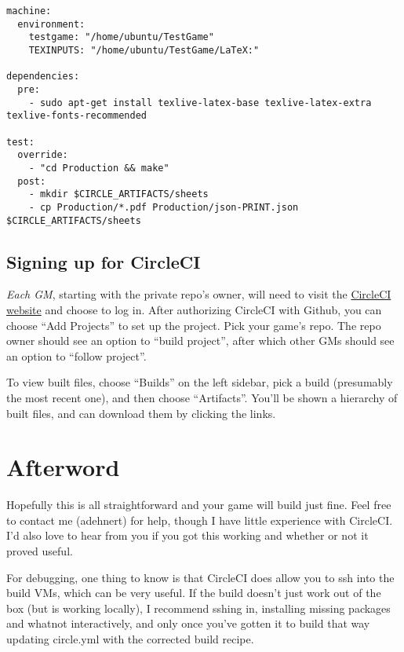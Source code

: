 \documentclass[green]{testgame}
\begin{document}
\begin{verbatim}
machine:
  environment:
    testgame: "/home/ubuntu/TestGame"
    TEXINPUTS: "/home/ubuntu/TestGame/LaTeX:"

dependencies:
  pre:
    - sudo apt-get install texlive-latex-base texlive-latex-extra texlive-fonts-recommended

test:
  override:
    - "cd Production && make"
  post:
    - mkdir $CIRCLE_ARTIFACTS/sheets
    - cp Production/*.pdf Production/json-PRINT.json $CIRCLE_ARTIFACTS/sheets
\end{verbatim}

\subsection{Signing up for CircleCI}

\emph{Each GM}, starting with the private repo's owner, will need to visit the \href{https://circleci.com/}{CircleCI website} and choose to log in. After authorizing CircleCI with Github, you can choose ``Add Projects'' to set up the project. Pick your game's repo. The repo owner should see an option to ``build project'', after which other GMs should see an option to ``follow project''.

To view built files, choose ``Builds'' on the left sidebar, pick a build (presumably the most recent one), and then choose ``Artifacts''. You'll be shown a hierarchy of built files, and can download them by clicking the links.


\section{Afterword}

Hopefully this is all straightforward and your game will build just fine. Feel free to contact me (adehnert) for help, though I have little experience with CircleCI. I'd also love to hear from you if you got this working and whether or not it proved useful.

For debugging, one thing to know is that CircleCI does allow you to ssh into the build VMs, which can be very useful. If the build doesn't just work out of the box (but is working locally), I recommend sshing in, installing missing packages and whatnot interactively, and only once you've gotten it to build that way updating circle.yml with the corrected build recipe.
\end{document}
